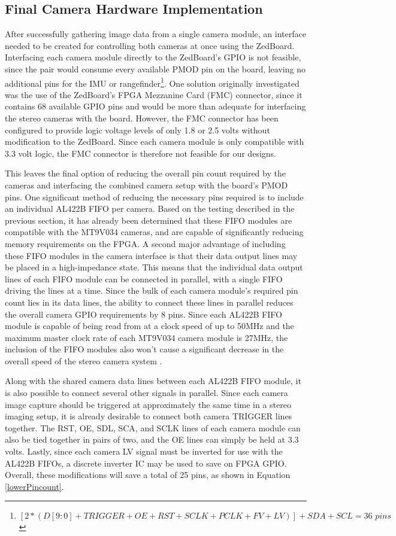 \subsection{Final Camera Hardware Implementation}
After successfully gathering image data from a single camera module, an interface needed to be created for controlling both cameras at once using the ZedBoard. Interfacing each camera module directly to the ZedBoard's GPIO is not feasible, since the pair would consume every available PMOD pin on the board, leaving no additional pins for the IMU or rangefinder\footnote{$[2*(D[9:0]+TRIGGER+OE+RST+SCLK+PCLK+FV+LV)]+SDA+SCL = 36\,\,pins$}. One solution originally investigated was the use of the ZedBoard's FPGA Mezzanine Card (FMC) connector, since it contains 68 available GPIO pins and would be more than adequate for interfacing the stereo cameras with the board. However, the FMC connector has been configured to provide logic voltage levels of only 1.8 or 2.5 volts without modification to the ZedBoard. Since each camera module is only compatible with 3.3 volt logic, the FMC connector is therefore not feasible for our designs.
\par
This leaves the final option of reducing the overall pin count required by the cameras and interfacing the combined camera setup with the board's PMOD pins. One significant method of reducing the necessary pins required is to include an individual AL422B FIFO per camera. Based on the testing described in the previous section, it has already been determined that these FIFO modules are compatible with the MT9V034 cameras, and are capable of significantly reducing memory requirements on the FPGA. A second major advantage of including these FIFO modules in the camera interface is that their data output lines may be placed in a high-impedance state. This means that the individual data output lines of each FIFO module can be connected in parallel, with a single FIFO driving the lines at a time. Since the bulk of each camera module's required pin count lies in its data lines, the ability to connect these lines in parallel reduces the overall camera GPIO requirements by 8 pins. Since each AL422B FIFO module is capable of being read from at a clock speed of up to 50MHz and the maximum master clock rate of each MT9V034 camera module is 27MHz, the inclusion of the FIFO modules also won't cause a significant decrease in the overall speed of the stereo camera system \cite{al422b,mt9v034}.
\par
Along with the shared camera data lines between each AL422B FIFO module, it is also possible to connect several other signals in parallel. Since each camera image capture should be triggered at approximately the same time in a stereo imaging setup, it is already desirable to connect both camera TRIGGER lines together. The RST, OE, SDL, SCA, and SCLK lines of each camera module can also be tied together in pairs of two, and the OE lines can simply be held at 3.3 volts. Lastly, since each camera LV signal must be inverted for use with the AL422B FIFOs, a discrete inverter IC may be used to save on FPGA GPIO. Overall, these modifications will save a total of 25 pins, as shown in Equation \ref{lowerPincount}.
